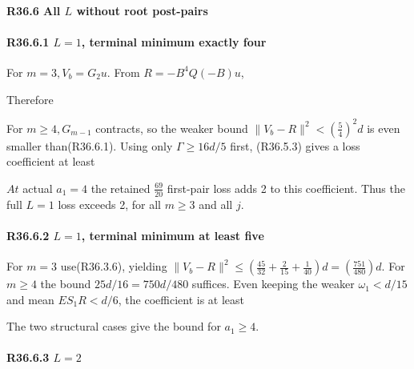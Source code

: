 \paragraph{R36.6 All \(L\) without root post-pairs}

\paragraph{R36.6.1 \(L=1\), terminal minimum exactly four}

For \(m=3,\allowbreak \allowbreak  V_b=G_2 u\). From \(R=-B^4 Q(-B)u\),


Therefore


For \(m\ge 4,\allowbreak \allowbreak  G_{m-1}\) contracts, so the weaker bound \(\lVert V_b-R\rVert ^2<(\frac{5}{4})^2d\) is even smaller than(R36.6.1). Using only \(\Gamma\ge 16d/5\) first, (R36.5.3) gives a loss coefficient at least


\(At\) actual \(a_{1}=4\) the retained \(\frac{69}{20}\) first-pair loss adds 2 to this coefficient. Thus the full \(L=1\) loss exceeds 2, for all \(m\ge 3\) and all \(j\).

\paragraph{R36.6.2 \(L=1\), terminal minimum at least five}

For \(m=3\) use(R36.3.6), yielding \(\lVert V_b-R\rVert ^2\le (\frac{45}{32}+\frac{2}{15}+\frac{1}{40})d=(\frac{751}{480})d\). For \(m\ge 4\) the bound \(25d/16=750d/480\) suffices. Even keeping the weaker \(\omega_1<d/15\) and mean \(E S_1 R<d/6\), the coefficient is at least


The two structural cases give the bound for \(a_{1}\ge 4\).

\paragraph{R36.6.3 \(L=2\)}

